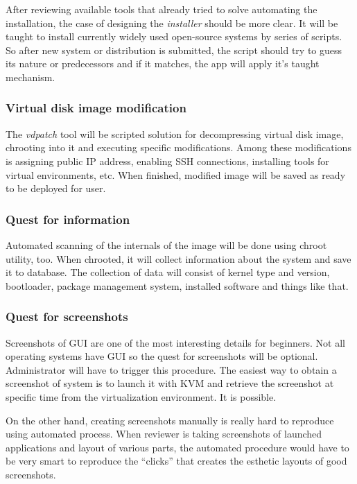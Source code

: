 \documentclass[thesis=B,english]{FITthesis}[2013/04/26]
\begin{document}
After reviewing available tools that already tried to solve automating the installation, the case of designing the \emph{installer} should be more clear. It will be taught to install currently widely used open-source systems by series of scripts. So after new system or distribution is submitted, the script should try to guess its nature or predecessors and if it matches, the app will apply it's taught mechanism.

\subsubsection{Virtual disk image modification}

The \emph{vdpatch} tool will be scripted solution for decompressing virtual disk image, chrooting into it and executing specific modifications. Among these modifications is assigning public IP address, enabling SSH connections, installing tools for virtual environments, etc. When finished, modified image will be saved as ready to be deployed for user.

\subsubsection{Quest for information}

Automated scanning of the internals of the image will be done using chroot utility, too. When chrooted, it will collect information about the system and save it to database. The collection of data will consist of kernel type and version, bootloader, package management system, installed software and things like that.

\subsubsection{Quest for screenshots}

Screenshots of GUI are one of the most interesting details for beginners. Not all operating systems have GUI so the quest for screenshots will be optional. Administrator will have to trigger this procedure. The easiest way to obtain a screenshot of system is to launch it with KVM and retrieve the screenshot at specific time from the virtualization environment. It is possible.

On the other hand, creating screenshots manually is really hard to reproduce using automated process. When reviewer is taking screenshots of launched applications and layout of various parts, the automated procedure would have to be very smart to reproduce the ``clicks'' that creates the esthetic layouts of good screenshots.
\end{document}
